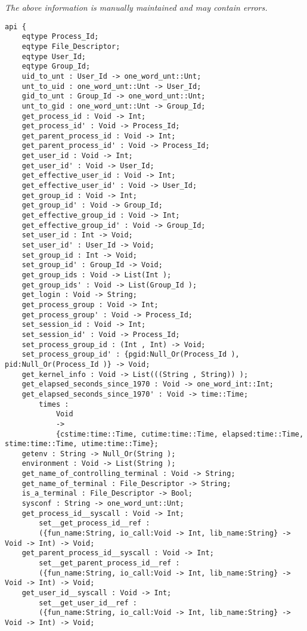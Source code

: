 \label{api:Posix\_Id}

{\tiny \it The above information is manually maintained and may contain errors.}
\begin{verbatim}
api {
    eqtype Process_Id;
    eqtype File_Descriptor;
    eqtype User_Id;
    eqtype Group_Id;
    uid_to_unt : User_Id -> one_word_unt::Unt;
    unt_to_uid : one_word_unt::Unt -> User_Id;
    gid_to_unt : Group_Id -> one_word_unt::Unt;
    unt_to_gid : one_word_unt::Unt -> Group_Id;
    get_process_id : Void -> Int;
    get_process_id' : Void -> Process_Id;
    get_parent_process_id : Void -> Int;
    get_parent_process_id' : Void -> Process_Id;
    get_user_id : Void -> Int;
    get_user_id' : Void -> User_Id;
    get_effective_user_id : Void -> Int;
    get_effective_user_id' : Void -> User_Id;
    get_group_id : Void -> Int;
    get_group_id' : Void -> Group_Id;
    get_effective_group_id : Void -> Int;
    get_effective_group_id' : Void -> Group_Id;
    set_user_id : Int -> Void;
    set_user_id' : User_Id -> Void;
    set_group_id : Int -> Void;
    set_group_id' : Group_Id -> Void;
    get_group_ids : Void -> List(Int );
    get_group_ids' : Void -> List(Group_Id );
    get_login : Void -> String;
    get_process_group : Void -> Int;
    get_process_group' : Void -> Process_Id;
    set_session_id : Void -> Int;
    set_session_id' : Void -> Process_Id;
    set_process_group_id : (Int , Int) -> Void;
    set_process_group_id' : {pgid:Null_Or(Process_Id ), pid:Null_Or(Process_Id )} -> Void;
    get_kernel_info : Void -> List(((String , String)) );
    get_elapsed_seconds_since_1970 : Void -> one_word_int::Int;
    get_elapsed_seconds_since_1970' : Void -> time::Time;
        times :
            Void
            ->
            {cstime:time::Time, cutime:time::Time, elapsed:time::Time, stime:time::Time, utime:time::Time};
    getenv : String -> Null_Or(String );
    environment : Void -> List(String );
    get_name_of_controlling_terminal : Void -> String;
    get_name_of_terminal : File_Descriptor -> String;
    is_a_terminal : File_Descriptor -> Bool;
    sysconf : String -> one_word_unt::Unt;
    get_process_id__syscall : Void -> Int;
        set__get_process_id__ref :
        ({fun_name:String, io_call:Void -> Int, lib_name:String} -> Void -> Int) -> Void;
    get_parent_process_id__syscall : Void -> Int;
        set__get_parent_process_id__ref :
        ({fun_name:String, io_call:Void -> Int, lib_name:String} -> Void -> Int) -> Void;
    get_user_id__syscall : Void -> Int;
        set__get_user_id__ref :
        ({fun_name:String, io_call:Void -> Int, lib_name:String} -> Void -> Int) -> Void;

\end{verbatim}
